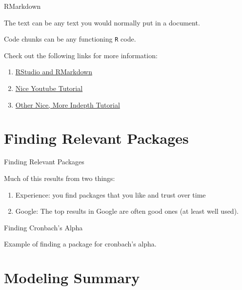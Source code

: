 \begin{frame}[fragile]{RMarkdown}

The text can be any text you would normally put in a document.

Code chunks can be any functioning \texttt{R} code.

Check out the following links for more information:

\begin{enumerate}
\def\labelenumi{\arabic{enumi}.}
\tightlist
\item
  \href{http://rmarkdown.rstudio.com/lesson-1.html}{RStudio and
  RMarkdown}
\item
  \href{https://www.youtube.com/watch?v=DNS7i2m4sB0}{Nice Youtube
  Tutorial}
\item
  \href{https://www.youtube.com/watch?v=cWJzjHh_3kk}{Other Nice, More
  Indepth Tutorial}
\end{enumerate}

\end{frame}

\section{Finding Relevant Packages}\label{finding-relevant-packages}

\begin{frame}{Finding Relevant Packages}

Much of this results from two things:

\begin{enumerate}
\def\labelenumi{\arabic{enumi}.}
\tightlist
\item
  Experience: you find packages that you like and trust over time
\item
  Google: The top results in Google are often good ones (at least well
  used).
\end{enumerate}

\end{frame}

\begin{frame}{Finding Cronbach's Alpha}

Example of finding a package for cronbach's alpha.

\end{frame}

\section{Modeling Summary}\label{modeling-summary}

